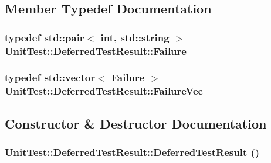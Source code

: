 \subsection{Member Typedef Documentation}
\hypertarget{struct_unit_test_1_1_deferred_test_result_9f60e64f7c34781b4ea43114bdb5aaf8}{
\subsubsection[{Failure}]{\setlength{\rightskip}{0pt plus 5cm}typedef std::pair$<$ int, std::string $>$ {\bf UnitTest::DeferredTestResult::Failure}}}
\label{struct_unit_test_1_1_deferred_test_result_9f60e64f7c34781b4ea43114bdb5aaf8}


\hypertarget{struct_unit_test_1_1_deferred_test_result_48bb871ebaf048316581941194b2f887}{
\subsubsection[{FailureVec}]{\setlength{\rightskip}{0pt plus 5cm}typedef std::vector$<$ {\bf Failure} $>$ {\bf UnitTest::DeferredTestResult::FailureVec}}}
\label{struct_unit_test_1_1_deferred_test_result_48bb871ebaf048316581941194b2f887}




\subsection{Constructor \& Destructor Documentation}
\hypertarget{struct_unit_test_1_1_deferred_test_result_a9176ae2d6884ac31861638ad3c2eb56}{
\subsubsection[{DeferredTestResult}]{\setlength{\rightskip}{0pt plus 5cm}UnitTest::DeferredTestResult::DeferredTestResult ()}}
\label{struct_unit_test_1_1_deferred_test_result_a9176ae2d6884ac31861638ad3c2eb56}


